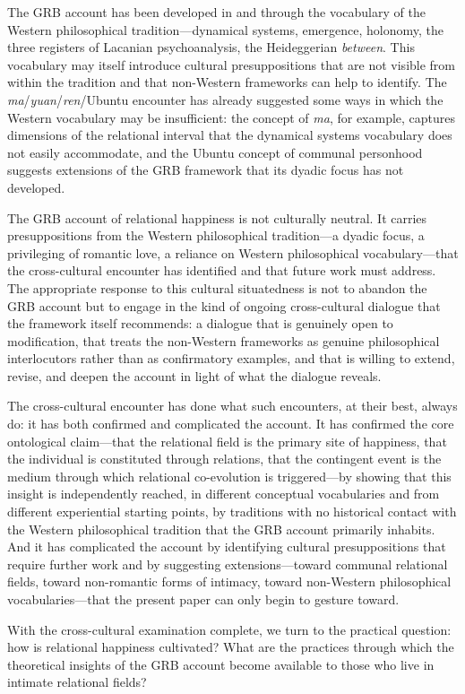  The GRB account has been developed in and through the vocabulary of the Western philosophical tradition---dynamical systems, emergence, holonomy, the three registers of Lacanian psychoanalysis, the Heideggerian \emph{between}. This vocabulary may itself introduce cultural presuppositions that are not visible from within the tradition and that non-Western frameworks can help to identify. The \emph{ma}/\emph{yuan}/\emph{ren}/Ubuntu encounter has already suggested some ways in which the Western vocabulary may be insufficient: the concept of \emph{ma}, for example, captures dimensions of the relational interval that the dynamical systems vocabulary does not easily accommodate, and the Ubuntu concept of communal personhood suggests extensions of the GRB framework that its dyadic focus has not developed.

\begin{claim}
The GRB account of relational happiness is not culturally neutral. It carries presuppositions from the Western philosophical tradition---a dyadic focus, a privileging of romantic love, a reliance on Western philosophical vocabulary---that the cross-cultural encounter has identified and that future work must address. The appropriate response to this cultural situatedness is not to abandon the GRB account but to engage in the kind of ongoing cross-cultural dialogue that the framework itself recommends: a dialogue that is genuinely open to modification, that treats the non-Western frameworks as genuine philosophical interlocutors rather than as confirmatory examples, and that is willing to extend, revise, and deepen the account in light of what the dialogue reveals.
\end{claim}

The cross-cultural encounter has done what such encounters, at their best, always do: it has both confirmed and complicated the account. It has confirmed the core ontological claim---that the relational field is the primary site of happiness, that the individual is constituted through relations, that the contingent event is the medium through which relational co-evolution is triggered---by showing that this insight is independently reached, in different conceptual vocabularies and from different experiential starting points, by traditions with no historical contact with the Western philosophical tradition that the GRB account primarily inhabits. And it has complicated the account by identifying cultural presuppositions that require further work and by suggesting extensions---toward communal relational fields, toward non-romantic forms of intimacy, toward non-Western philosophical vocabularies---that the present paper can only begin to gesture toward.

With the cross-cultural examination complete, we turn to the practical question: how is relational happiness cultivated? What are the practices through which the theoretical insights of the GRB account become available to those who live in intimate relational fields?
